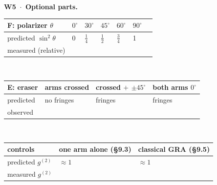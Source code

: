 \documentclass[a4paper,11pt]{article}
\begin{document}
\vspace{6pt}
\textbf{W5 \,$\cdot$\, Optional parts.}\\[2pt]
\begin{tabular}{|Y{3.4cm}|Y{1.3cm}|Y{1.3cm}|Y{1.3cm}|Y{1.3cm}|Y{1.3cm}|Y{5.2cm}|}\hline
F: polarizer $\theta$ & $0^\circ$ & $30^\circ$ & $45^\circ$ & $60^\circ$ & $90^\circ$ & \\ \hline
predicted $\sin^2\theta$ & 0 & $\tfrac14$ & $\tfrac12$ & $\tfrac34$ & 1 & \\ \hline
measured (relative) & & & & & & \\ \hline
\end{tabular}\\[3pt]
\begin{tabular}{|Y{3.4cm}|Y{3.2cm}|Y{3.4cm}|Y{3.2cm}|}\hline
E: eraser & arms crossed & crossed $+$ $\pm45^\circ$ & both arms $0^\circ$ \\ \hline
predicted & no fringes & fringes & fringes \\ \hline
observed & & & \\ \hline
\end{tabular}\\[3pt]
\begin{tabular}{|Y{3.4cm}|Y{4.2cm}|Y{4.2cm}|}\hline
controls & one arm alone (\S9.3) & classical GRA (\S9.5) \\ \hline
predicted $g^{(2)}$ & $\approx 1$ & $\approx 1$ \\ \hline
measured $g^{(2)}$ & & \\ \hline
\end{tabular}
\end{document}
